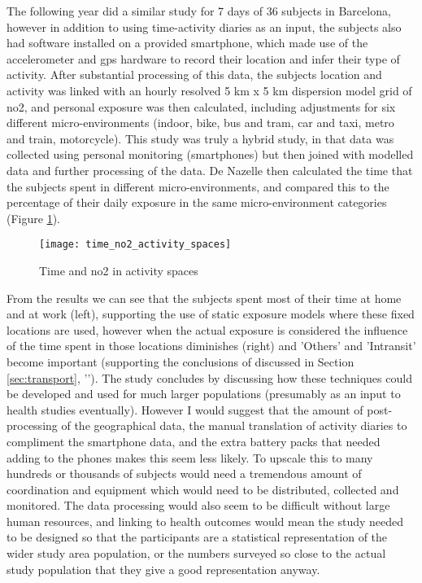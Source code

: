 The following year \cite{DeNazelle2013} did a similar study for 7 days of 36 subjects in Barcelona, however in addition to using time-activity diaries as an input, the subjects also had software installed on a provided smartphone, which made use of the accelerometer and \gls{gps} hardware to record their location and infer their type of activity. After substantial processing of this data, the subjects location and activity was linked with an hourly resolved 5 km x 5 km dispersion model grid of \gls{no2}, and personal exposure was then calculated, including adjustments for six different micro-environments (indoor, bike, bus and tram, car and taxi, metro and train, motorcycle). This study was truly a hybrid study, in that data was collected using personal monitoring (smartphones) but then joined with modelled data and further processing of the data. De Nazelle then calculated the time that the subjects spent in different micro-environments, and compared this to the percentage of their daily exposure in the same micro-environment categories (Figure \ref{fig:time_no2_activity_spaces}).

\begin{figure}[H]
\centering
\texttt{[image: time\_no2\_activity\_spaces]}
\caption{Time and \gls{no2} in activity spaces}
\label{fig:time_no2_activity_spaces}
\end{figure}

From the results we can see that the subjects spent most of their time at home and at work (left), supporting the use of static exposure models where these fixed locations are used, however when the actual exposure is considered the influence of the time spent in those locations diminishes (right) and 'Others' and 'Intransit' become important (supporting the conclusions of \cite{Dons2011} discussed in Section \ref{sec:transport}, ''). The study concludes by discussing how these techniques could be developed and used for much larger populations (presumably as an input to health studies eventually). However I would suggest that the amount of post-processing of the geographical data, the manual translation of activity diaries to compliment the smartphone data, and the extra battery packs that needed adding to the phones makes this seem less likely. To upscale this to many hundreds or thousands of subjects would need a tremendous amount of coordination and equipment which would need to be distributed, collected and monitored. The data processing would also seem to be difficult without large human resources, and linking to health outcomes would mean the study needed to be designed so that the participants are a statistical representation of the wider study area population, or the numbers surveyed so close to the actual study population that they give a good representation anyway. 

